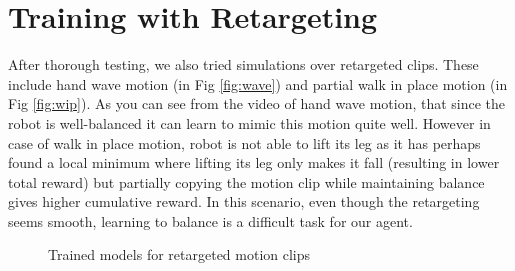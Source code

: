 \newpage
\section{Training with Retargeting}

After thorough testing, we also tried simulations over retargeted clips. These include hand wave motion (in Fig \ref{fig:wave}) and partial walk in place motion (in Fig \ref{fig:wip}). As you can see from the video of hand wave motion, that since the robot is well-balanced it can learn to mimic this motion quite well. However in case of walk in place motion, robot is not able to lift its leg as it has perhaps found a local minimum where lifting its leg only makes it fall (resulting in lower total reward) but partially copying the motion clip while maintaining balance gives higher cumulative reward. In this scenario, even though the retargeting seems smooth, learning to balance is a difficult task for our agent.

\begin{figure}[!ht]
    \centering
    \qquad
    \qquad
    \label{fig:subfigname}
    \caption{Trained models for retargeted motion clips}
\end{figure}

